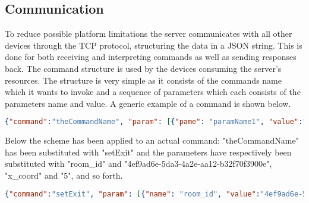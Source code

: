 \subsection{Communication}

To reduce possible platform limitations the server communicates with all other devices through the TCP protocol, structuring the data in a JSON string. This is done for both receiving and interpreting commands as well as sending responses back.
The command structure is used by the devices consuming the server's resources. The structure is very simple as it consists of the commands name which it wants to invoke and a sequence of parameters which each consists of the parameters name and value.
A generic example of a command is shown below. 
\begin{center}
	\begin{lstlisting}[language=json]
	{"command":"theCommandName", "param": [{"pame": "paramName1", "value":"paramValue1"}, {"name": "paramName2", "value":"paramValue2"}, {"name": "paramName3", "value":"paramValue3"}, {"name": "paramName4", "value":"paramValue4"}]}
	\end{lstlisting}
\end{center}
Below the scheme has been applied to an actual command: "theCommandName" has been substituted with "setExit" and the parameters have respectively been substituted with "room\_id" and "4ef9ad6e-5da3-4a2e-aa12-b32f70f3900e", "x\_coord" and "5", and so forth. 

\begin{center}
	\begin{lstlisting}[language=json,firstnumber=1]
	{"command":"setExit", "param": [{"name": "room_id", "value":"4ef9ad6e-5da3-4a2e-aa12-b32f70f3900e"}, {"name": "x_coord", "value":"5"}, {"name": "y_coord", "value":"470"}, {"name": "is_exit", "value":"true"}]}
	\end{lstlisting}
\end{center}

